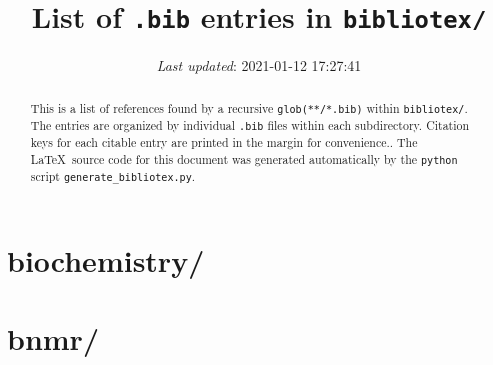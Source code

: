 \documentclass[letterpaper, 10pt, oneside, openany]{report}
\title{List of \texttt{.bib} entries in \texttt{bibliotex/}}
\date{\textit{Last updated}: 2021-01-12 17:27:41}
\begin{document}
\maketitle

\begin{abstract}
	This is a list of references found by a recursive \texttt{glob(**/*.bib)} within \texttt{bibliotex/}.
	The entries are organized by individual \texttt{.bib} files within each subdirectory.
	Citation keys for each citable entry are printed in the margin for convenience..
	The \LaTeX\ source code for this document was generated automatically by the \texttt{python} script \texttt{generate\_bibliotex.py}.
\end{abstract}

\tableofcontents

\chapter*{biochemistry/}

\begin{refsection}
	\nocite{*}
	\printbibliography[title = {Mg.bib}, heading = subbibintoc]
\end{refsection}

\chapter*{bnmr/}

\begin{refsection}
	\nocite{*}
	\printbibliography[title = {argonne.bib}, heading = subbibintoc]
\end{refsection}

\begin{refsection}
	\nocite{*}
	\printbibliography[title = {bejing.bib}, heading = subbibintoc]
\end{refsection}

\begin{refsection}
	\nocite{*}
	\printbibliography[title = {berkeley.bib}, heading = subbibintoc]
\end{refsection}

\begin{refsection}
	\nocite{*}
	\printbibliography[title = {groningen.bib}, heading = subbibintoc]
\end{refsection}
\end{document}
